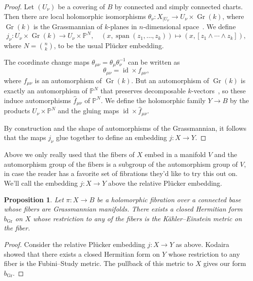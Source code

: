 \documentclass[10pt,a4paper]{amsart}
\newtheorem{prop}[theo]{Proposition}
\theoremstyle{definition}
\newcommand{\kk}[1]{\mathbb{#1}}
\DeclareMathOperator{\Span}{span}
\DeclareMathOperator{\Gr}{Gr}
\DeclareMathOperator{\id}{id}
\begin{document}
\begin{proof}
Let $(U_{\nu})$ be a covering of $B$ by connected and simply connected charts.
Then there are local holomorphic isomorphisms $\theta_{\nu} : X_{|U_{\nu}} \to U_{\nu} \times \Gr(k)$, where $\Gr(k)$ is the Grassmannian of $k$-planes in $n$-dimensional space~\cite{fischer1965lokal}.
We define
\[
  j_{\nu} : U_{\nu} \times \Gr(k) \to U_{\nu} \times \kk P^{N},
  \quad
  (x, \Span(z_{1}, \ldots, z_{k}))
  \mapsto
  (x, [z_{1} \wedge \cdots \wedge z_{k}]),
\]
where $N = \binom nk$,
to be the usual Pl\"ucker embedding.

The coordinate change maps $\theta_{\mu\nu} = \theta_{\mu}\theta_{\nu}^{-1}$ can be written as
\[
\theta_{\mu\nu} = \id \times f_{\mu\nu},
\]
where $f_{\mu\nu}$ is an automorphism of $\Gr(k)$.
But an automorphism of $\Gr(k)$ is exactly an automorphism of $\kk P^{N}$ that preserves decomposable $k$-vectors~\cite{cowen1989automorphisms}, so these induce automorphisms $\hat f_{\mu\nu}$ of $\kk P^{N}$. We define the holomorphic family $Y \to B$ by the products $U_{\nu} \times \kk P^{N}$ and the gluing maps $\id \times \hat f_{\mu\nu}$.

By construction and the shape of automorphisms of the Grassmannian, it follows that the maps $j_{\nu}$ glue together to define an embedding $j : X \to Y$.
\end{proof}

Above we only really used that the fibers of $X$ embed in a manifold $V$ and the automorphism group of the fibers is a subgroup of the automorphism group of $V$, in case the reader has a favorite set of fibrations they'd like to try this out on.
We'll call the embedding $j : X \to Y$ above the relative Pl\"ucker embedding.

\begin{prop}
Let $\pi : X \to B$ be a holomorphic fibration over a connected base whose fibers are Grassmannian manifolds.
There exists a closed Hermitian form $b_{\Gr}$ on $X$ whose restriction to any of the fibers is the K\"ahler--Einstein metric on the fiber.
\end{prop}

\begin{proof}
Consider the relative Pl\"ucker embedding $j : X \to Y$ as above.
Kodaira~\cite[Section 4(V)]{kodaira-embedding} showed that there exists a closed Hermitian form on $Y$ whose restriction to any fiber is the Fubini--Study metric.
The pullback of this metric to $X$ gives our form $b_{\Gr}$.
\end{proof}
\end{document}
